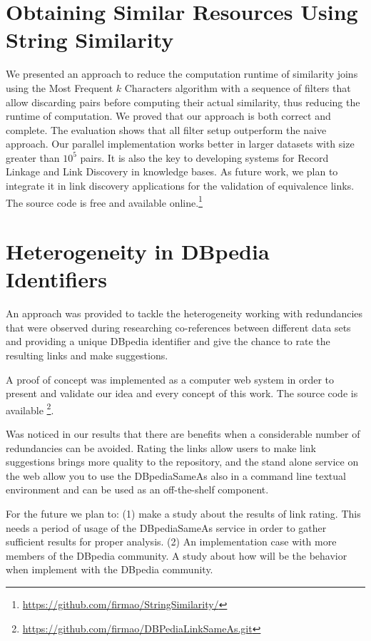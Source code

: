 \section{Obtaining Similar Resources Using String Similarity}
We presented an approach to reduce the computation runtime of similarity joins using the Most Frequent $k$ Characters algorithm with a sequence of filters that allow discarding pairs before computing their actual similarity, thus reducing the runtime of computation.
We proved that our approach is both correct and complete. 
The evaluation shows that all filter setup outperform the naive approach. Our parallel implementation works better in larger datasets with size greater than $10^5$ pairs.
It is also the key to developing systems for Record Linkage and Link Discovery in knowledge bases.
As future work, we plan to integrate it in link discovery applications for the validation of equivalence links. The source code is free and available online.\footnote{\url{https://github.com/firmao/StringSimilarity/}}

\section{Heterogeneity in DBpedia Identifiers}
An approach was provided to tackle the heterogeneity working with  redundancies that were observed during researching co-references between different data sets and providing a unique DBpedia identifier and give the chance to rate the resulting links and make suggestions.

A proof of concept was implemented as a computer web system in order to present and validate our idea and every concept of this work. The source code is available \footnote{\url{https://github.com/firmao/DBPediaLinkSameAs.git}}.

Was noticed in our results that there are benefits when a considerable number of  redundancies can be avoided. Rating the links allow users to make link suggestions brings more quality to the repository, and the stand alone service on the web allow you to use the DBpediaSameAs also in a command line textual environment and can be used as an off-the-shelf component.

For the future we plan to:
(1) make a study about the results of link rating. This needs a period of usage of the DBpediaSameAs service in order to gather sufficient results for proper analysis.
(2) An implementation case with more members of the DBpedia community. A study about how will be the behavior when implement with the DBpedia community.

